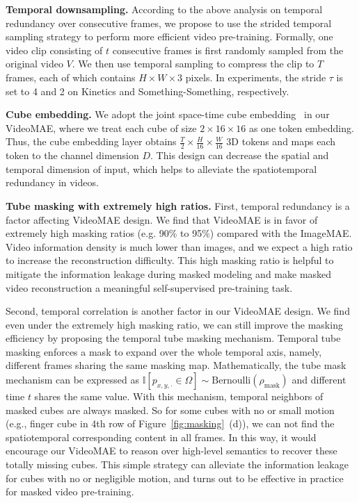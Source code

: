 \documentclass{article}
\begin{document}
\par{\noindent \textbf{Temporal downsampling.}} According to the above analysis on temporal redundancy over consecutive frames, we propose to use the strided temporal sampling strategy to perform more efficient video pre-training. Formally, one video clip consisting of $t$ consecutive frames is first randomly sampled from the original video $V$. We then use temporal sampling to compress the clip to $T$ frames, each of which contains $H\times W\times 3 $ pixels.
In experiments, the stride $\tau$ is set to 4 and 2 on Kinetics and Something-Something, respectively.

\par{\noindent \textbf{Cube embedding.}} We adopt the joint space-time cube embedding~\cite{vivit,mvit,liu2021video} in our VideoMAE, where we treat each cube of size $2\times16\times16$ as one token embedding. Thus, the cube embedding layer obtains $ \frac{T}{2}\times \frac{H}{16}\times \frac{W}{16}$ 3D tokens and maps each token to the channel dimension $D$. 
This design can decrease the spatial and temporal dimension of input, which helps to alleviate the spatiotemporal redundancy in videos.

\par{\noindent \textbf{Tube masking with extremely high ratios.}}
First, temporal redundancy is a factor affecting VideoMAE design. We find that VideoMAE is in favor of extremely high masking ratios (e.g. 90\% to 95\%) compared with the ImageMAE. Video information density is much lower than images, and we expect a high ratio to increase the reconstruction difficulty. This high masking ratio is helpful to mitigate the information leakage during masked modeling and make masked video reconstruction a meaningful self-supervised pre-training task.

Second, temporal correlation is another factor in our VideoMAE design. We find even under the extremely high masking ratio, we can still improve the masking efficiency by proposing the temporal tube masking mechanism. 
Temporal tube masking enforces a mask to expand over the whole temporal axis, namely, different frames sharing the same masking map. Mathematically, the tube mask mechanism can be expressed as 
$\mathbb{I}[p_{x, y, \cdot} \in \Omega] \sim \mathrm{Bernoulli}(\rho_\mathrm{mask})$ and different time $t$ shares the same value.
With this mechanism, temporal neighbors of masked cubes are always masked. So for some cubes with no or small motion (e.g., finger cube in 4th row of Figure~\ref{fig:masking}~(d)), we can not find the spatiotemporal corresponding content in all frames. In this way, it would encourage our VideoMAE to reason over high-level semantics to recover these totally missing cubes. 
This simple strategy can alleviate the information leakage for cubes with no or negligible motion, and turns out to be effective in practice for masked video pre-training.
\end{document}

